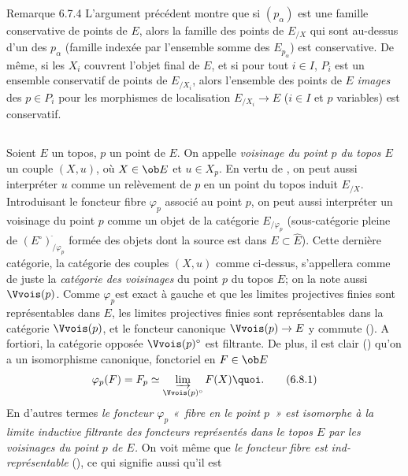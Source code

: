 \documentclass[10pt]{../fichiers-configuration-latex/smfart}
\begin{document}
\begin{enonce*}[remark]{Remarque 6.7.4}
L'argument précédent montre que si $(p_{\alpha})$ est une famille
conservative de points de $E$, alors la famille des points de
$E_{/X}$ qui sont au-dessus d'un des $p_{\alpha}$ (famille indexée
par l'ensemble somme des $E_{p_{\alpha}}$) est conservative. De
même, si les $X_i$ couvrent l'objet final de $E$, et si pour tout
$i\in I$, $P_i$ est un ensemble conservatif de points de $E_{/X_i}$,
alors l'ensemble des points de $E$ \emph{images} des $p\in P_i$ pour
les morphismes de localisation $E_{/X_i}\rightarrow E$ ($i\in I$ et
$p$ variables) est conservatif.
\end{enonce*}

\setcounter{subsection}{7}
\subsection{}
Soient $E$ un topos, $p$ un point de $E$. On appelle \emph{voisinage
du point $p$ du topos $E$} un couple $(X,u)$, où $X\in \ob E$ et
$u\in X_p$. En vertu de , on peut aussi interpréter $u$
comme un relèvement de $p$ en un point du topos induit $E_{/X}$.
Introduisant le foncteur fibre $\varphi_p$ associé au point $p$, on
peut aussi interpréter un voisinage du point $p$ comme un objet de
la catégorie $E_{/\varphi_p}$ (sous-catégorie pleine de
$(E^\circ)^{\widehat{\phantom{,}}}_{/\varphi_p}$ formée des objets
dont la source est dans $E\subset \widehat{E}$). Cette dernière
catégorie, \ie la catégorie des couples $(X,u)$ comme ci-dessus,
s'appellera comme de juste la \emph{catégorie des voisinages} du
point $p$ du topos $E$; on la note aussi $\Vvois(p)$. Comme
$\varphi_p$\pageoriginale est exact à gauche et que les limites
projectives finies sont représentables dans $E$, les limites
projectives finies sont représentables dans la catégorie
$\Vvois(p)$, et le foncteur canonique $\Vvois(p)\rightarrow E$ y
commute (). A fortiori, la catégorie opposée
$\Vvois(p)^{\circ}$ est filtrante. De plus, il est clair
() qu'on a un isomorphisme canonique, fonctoriel en
$F\in \ob E$
\begin{equation*}
\varphi_p(F)=F_p\simeq
\varinjlim_{\Vvois(p)^{\circ}}F(X){\quoi}.\tag{6.8.1}
\end{equation*}
En d'autres termes \emph{le foncteur $\varphi_p$ « fibre en le
point $p$ »  est isomorphe à la limite inductive filtrante des
foncteurs représentés dans le topos $E$ par les voisinages du point
$p$ de $E$.} On voit même que \emph{le foncteur fibre est
ind-représentable} (), ce qui signifie aussi qu'il est
\end{document}
